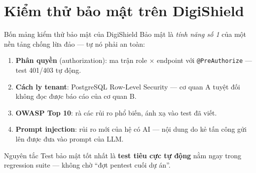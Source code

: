 \documentclass[aspectratio=169,12pt]{beamer}
\begin{document}
\section{Kiểm thử bảo mật trên DigiShield}

\begin{frame}{Bốn mảng kiểm thử bảo mật của DigiShield}
  Bảo mật là \emph{tính năng số 1} của một nền tảng chống lừa đảo --- tự nó phải an toàn:
  \begin{enumerate}
    \item \textbf{Phân quyền} (authorization): ma trận role $\times$ endpoint với \texttt{@PreAuthorize} --- test 401/403 tự động.
    \item \textbf{Cách ly tenant}: PostgreSQL Row-Level Security --- cơ quan A tuyệt đối không đọc được báo cáo của cơ quan B.
    \item \textbf{OWASP Top 10}: rà các rủi ro phổ biến, ánh xạ vào test đã viết.
    \item \textbf{Prompt injection}: rủi ro mới của hệ có AI --- nội dung do kẻ tấn công gửi lên được đưa vào prompt của LLM.
  \end{enumerate}
  \begin{block}{Nguyên tắc}
    Test bảo mật tốt nhất là \textbf{test tiêu cực tự động} nằm ngay trong regression suite --- không chờ ``đợt pentest cuối dự án''.
  \end{block}
\end{frame}
\end{document}
